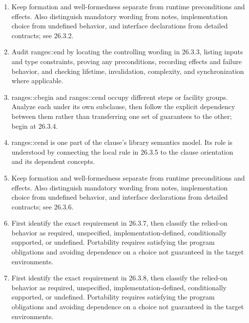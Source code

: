 \documentclass[11pt,letterpaper]{article}
\begin{document}
\begin{enumerate}
\item Keep formation and well-formedness separate from runtime preconditions and effects. Also distinguish mandatory wording from notes, implementation choice from undefined behavior, and interface declarations from detailed contracts; see 26.3.2.
\item Audit ranges::end by locating the controlling wording in 26.3.3, listing inputs and type constraints, proving any preconditions, recording effects and failure behavior, and checking lifetime, invalidation, complexity, and synchronization where applicable.
\item ranges::cbegin and ranges::cend occupy different steps or facility groups. Analyze each under its own subclause, then follow the explicit dependency between them rather than transferring one set of guarantees to the other; begin at 26.3.4.
\item ranges::cend is one part of the clause's library semantics model. Its role is understood by connecting the local rule in 26.3.5 to the clause orientation and its dependent concepts.
\item Keep formation and well-formedness separate from runtime preconditions and effects. Also distinguish mandatory wording from notes, implementation choice from undefined behavior, and interface declarations from detailed contracts; see 26.3.6.
\item First identify the exact requirement in 26.3.7, then classify the relied-on behavior as required, unspecified, implementation-defined, conditionally supported, or undefined. Portability requires satisfying the program obligations and avoiding dependence on a choice not guaranteed in the target environments.
\item First identify the exact requirement in 26.3.8, then classify the relied-on behavior as required, unspecified, implementation-defined, conditionally supported, or undefined. Portability requires satisfying the program obligations and avoiding dependence on a choice not guaranteed in the target environments.
\end{enumerate}
\end{document}
